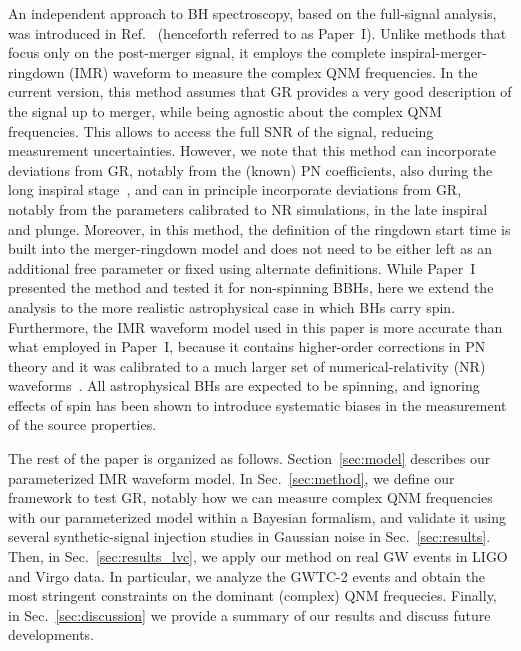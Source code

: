 \documentclass[twocolumn,prd,aps,superscriptaddress,preprintnumbers,tightenlines,showpacs,nofootinbib,eqsecnum,amsfonts,amsmath]{revtex4-1}
\newcommand{\paperone}{Paper~I\xspace}
\begin{document}
An independent approach to BH spectroscopy, based on the full-signal
analysis, was introduced in Ref.~\cite{Brito:2018rfr}
(henceforth referred to as \paperone). Unlike methods that focus only
on the post-merger signal, it employs the
complete inspiral-merger-ringdown
(IMR) waveform to measure the complex QNM
frequencies. In the current version, this method assumes that GR provides a very good description of the signal up to merger, while being agnostic about the complex QNM frequencies. This allows to access the full SNR of the signal, reducing
measurement uncertainties. However, we note that this method can incorporate deviations from GR, notably from the (known) PN coefficients,  
also during the long inspiral stage~\cite{Abbott:2018lct,
LIGOScientific:2019fpa,Abbott:2020jks}, and can in principle incorporate deviations from GR, notably from the parameters calibrated to NR simulations,  
in the late inspiral and plunge. Moreover, in this method, the definition of the
ringdown start time is built into the merger-ringdown model and does not need to be
either left as an additional free parameter or fixed using alternate
definitions. While \paperone presented the method and tested it for non-spinning BBHs, here we extend the analysis to the more
realistic astrophysical case in which BHs carry spin. Furthermore,
the IMR waveform model used in this paper is more accurate than what employed in \paperone,
because it contains higher-order corrections in PN theory and it was calibrated to a much larger set
of numerical-relativity (NR) waveforms~\cite{Bohe:2016gbl}. All astrophysical BHs are expected to be spinning,
and ignoring effects of spin has been shown to introduce systematic biases in the measurement of the
source properties.

The rest of the paper is organized as follows. Section~\ref{sec:model} describes our parameterized IMR
waveform model. In Sec.~\ref{sec:method}, we define our framework to test GR, notably how we can measure
complex QNM frequencies with our parameterized model within a Bayesian formalism, and validate it using 
several synthetic-signal injection studies in Gaussian noise in Sec.~\ref{sec:results}. Then, in Sec.~\ref{sec:results_lvc},
we apply our method on real GW events in LIGO and Virgo data. In particular, we analyze
the GWTC-2 events and obtain the most stringent constraints on the dominant (complex) QNM frequecies. Finally, in Sec.~\ref{sec:discussion} we provide a summary of
our results and discuss future developments.


\end{document}
